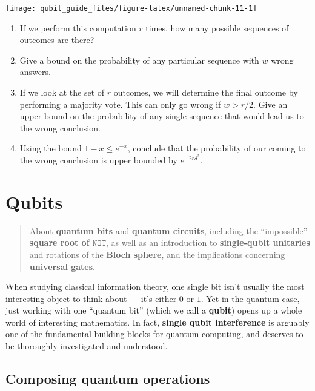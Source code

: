 \documentclass[fleqn]{article}
\providecommand{\tightlist}{%
  \setlength{\itemsep}{0pt}\setlength{\parskip}{0pt}}
\let\oldsection\section
\renewcommand\section{\clearpage\oldsection}
\begin{document}
\begin{center}\texttt{[image: qubit\_guide\_files/figure-latex/unnamed-chunk-11-1]} \end{center}

\begin{enumerate}
\def\labelenumi{\arabic{enumi}.}
\tightlist
\item
  If we perform this computation \(r\) times, how many possible sequences of outcomes are there?
\item
  Give a bound on the probability of any particular sequence with \(w\) wrong answers.
\item
  If we look at the set of \(r\) outcomes, we will determine the final outcome by performing a majority vote.
  This can only go wrong if \(w>r/2\).
  Give an upper bound on the probability of any single sequence that would lead us to the wrong conclusion.
\item
  Using the bound \(1-x\leqslant e^{-x}\), conclude that the probability of our coming to the wrong conclusion is upper bounded by \(e^{-2r\delta^2}\).
\end{enumerate}

\hypertarget{qubits}{%
\section{Qubits}\label{qubits}}

\begin{quote}
About \textbf{quantum bits} and \textbf{quantum circuits}, including the ``impossible'' \textbf{square root of \(\texttt{NOT}\)}, as well as an introduction to \textbf{single-qubit unitaries} and rotations of the \textbf{Bloch sphere}, and the implications concerning \textbf{universal gates}.
\end{quote}

When studying classical information theory, one single bit isn't usually the most interesting object to think about --- it's either \(0\) or \(1\).
Yet in the quantum case, just working with one ``quantum bit'' (which we call a \textbf{qubit}) opens up a whole world of interesting mathematics.
In fact, \textbf{single qubit interference} is arguably one of the fundamental building blocks for quantum computing, and deserves to be thoroughly investigated and understood.

\hypertarget{composing-quantum-operations}{%
\subsection{Composing quantum operations}\label{composing-quantum-operations}}
\end{document}
